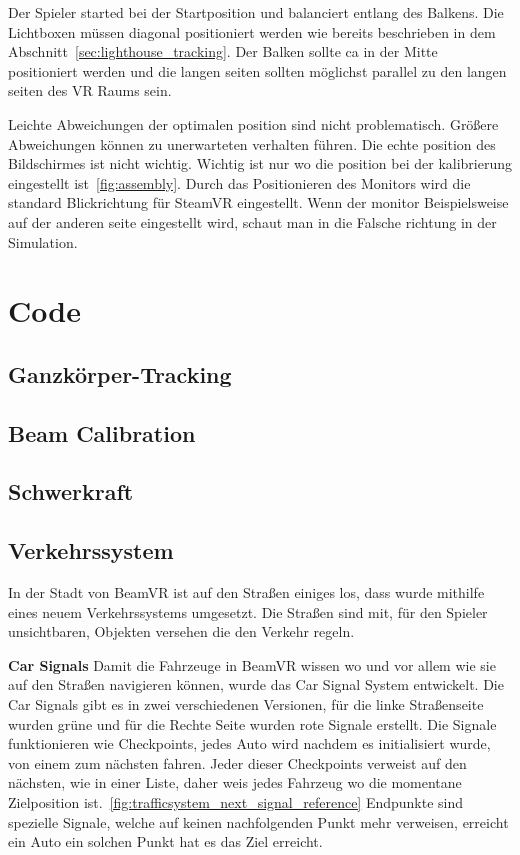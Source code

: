 Der Spieler started bei der Startposition und balanciert entlang des Balkens.
Die Lichtboxen müssen diagonal positioniert werden wie bereits beschrieben in dem Abschnitt~\ref{sec:lighthouse_tracking}.
Der Balken sollte ca in der Mitte positioniert werden und die langen seiten sollten möglichst parallel zu den langen seiten des VR Raums sein.

Leichte Abweichungen der optimalen position sind nicht problematisch.
Größere Abweichungen können zu unerwarteten verhalten führen.
Die echte position des Bildschirmes ist nicht wichtig.
Wichtig ist nur wo die position bei der kalibrierung eingestellt ist~\ref{fig:assembly}.
Durch das Positionieren des Monitors wird die standard Blickrichtung für SteamVR eingestellt.
Wenn der monitor Beispielsweise auf der anderen seite eingestellt wird, schaut man in die Falsche richtung in der Simulation.

\section{Code}
\label{sec:code}

\subsection{Ganzkörper-Tracking}
\label{sec:full-body-tracking}

\subsection{Beam Calibration}
\label{subsec:beam-calibration}

\subsection{Schwerkraft}
\label{subsec:gravity}

\subsection{Verkehrssystem}
\label{subsec:traffic-system}
In der Stadt von BeamVR ist auf den Straßen einiges los, dass wurde mithilfe eines neuem Verkehrssystems umgesetzt.
Die Straßen sind mit, f\"ur den Spieler unsichtbaren, Objekten versehen die den Verkehr regeln.

\textbf{Car Signals}
Damit die Fahrzeuge in BeamVR wissen wo und vor allem wie sie auf den Straßen navigieren k\"onnen, wurde das Car Signal System entwickelt.
Die Car Signals gibt es in zwei verschiedenen Versionen, f\"ur die linke Straßenseite wurden gr\"une und f\"ur die Rechte Seite wurden rote Signale erstellt.
Die Signale funktionieren wie Checkpoints, jedes Auto wird nachdem es initialisiert wurde, von einem zum n\"achsten fahren.
Jeder dieser Checkpoints verweist auf den nächsten, wie in einer Liste, daher weis jedes Fahrzeug wo die momentane Zielposition ist.~\ref{fig:trafficsystem_next_signal_reference}
Endpunkte sind spezielle Signale, welche auf keinen nachfolgenden Punkt mehr verweisen, erreicht ein Auto ein solchen Punkt hat es das Ziel erreicht.


